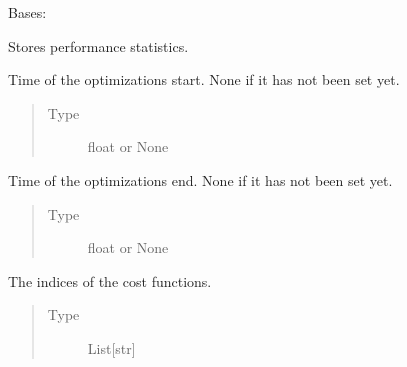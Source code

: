 \documentclass[letterpaper,10pt,english]{sphinxmanual}
\begin{document}
\begin{fulllineitems}
\label{\detokenize{qsim:qsim.performance_statistics.PerformanceStatistics}}
Bases: 

Stores performance statistics.

\begin{fulllineitems}
\label{\detokenize{qsim:qsim.performance_statistics.PerformanceStatistics.start_t_opt}}
Time of the optimizations start. None if it has not been set yet.
\begin{quote}\begin{description}
\item[{Type}] \leavevmode
float or None

\end{description}\end{quote}

\end{fulllineitems}


\begin{fulllineitems}
\label{\detokenize{qsim:qsim.performance_statistics.PerformanceStatistics.end_t_opt}}
Time of the optimizations end. None if it has not been set yet.
\begin{quote}\begin{description}
\item[{Type}] \leavevmode
float or None

\end{description}\end{quote}

\end{fulllineitems}


\begin{fulllineitems}
\label{\detokenize{qsim:qsim.performance_statistics.PerformanceStatistics.indices}}
The indices of the cost functions.
\begin{quote}\begin{description}
\item[{Type}] \leavevmode
List{[}str{]}


\end{description}
\end{quote}
\end{fulllineitems}
\end{fulllineitems}
\end{document}
